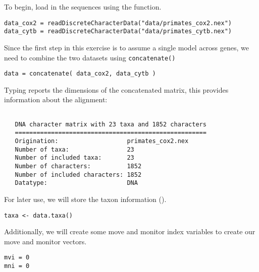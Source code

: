 To begin, load in the sequences using the  function. 
{\tt \begin{snugshade*}
\begin{lstlisting}
data_cox2 = readDiscreteCharacterData("data/primates_cox2.nex")
data_cytb = readDiscreteCharacterData("data/primates_cytb.nex")
\end{lstlisting}
\end{snugshade*}}

Since the first step in this exercise is to assume a single model across genes, we need to combine the two datasets using {\tt concatenate()}

{\tt \begin{snugshade*}
\begin{lstlisting}
data = concatenate( data_cox2, data_cytb )
\end{lstlisting}
\end{snugshade*}}

Typing  reports the dimensions of the concatenated matrix, this provides information about the alignment:


{\tt \begin{snugshade*}
\begin{lstlisting}

   DNA character matrix with 23 taxa and 1852 characters
   =====================================================
   Origination:                   primates_cox2.nex
   Number of taxa:                23
   Number of included taxa:       23
   Number of characters:          1852
   Number of included characters: 1852
   Datatype:                      DNA

\end{lstlisting}
\end{snugshade*}}

For later use, we will store the taxon information ().
{\tt \begin{snugshade*}
\begin{lstlisting}
taxa <- data.taxa()
\end{lstlisting}
\end{snugshade*}}

Additionally, we will create some move and monitor index variables to create our move and monitor vectors.
{\tt \begin{snugshade*}
\begin{lstlisting}
mvi = 0
mni = 0
\end{lstlisting}
\end{snugshade*}}

